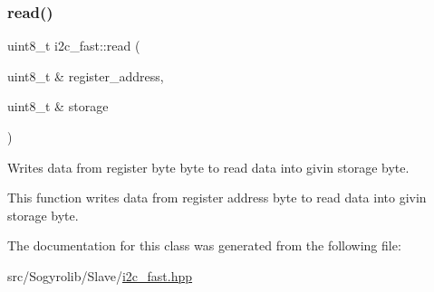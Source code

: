 \subsubsection{\texorpdfstring{read()}{read()}\hspace{0.1cm}{\footnotesize\ttfamily [2/2]}}
{\footnotesize\ttfamily uint8\+\_\+t i2c\+\_\+fast\+::read (\begin{DoxyParamCaption}\item[{uint8\+\_\+t \&}]{register\+\_\+address,  }\item[{uint8\+\_\+t \&}]{storage }\end{DoxyParamCaption})\hspace{0.3cm}{\ttfamily [inline]}}



Writes data from register byte byte to read data into givin storage byte. 

This function writes data from register address byte to read data into givin storage byte. 

The documentation for this class was generated from the following file\+:\begin{DoxyCompactItemize}
\item 
src/\+Sogyrolib/\+Slave/\hyperlink{i2c__fast_8hpp}{i2c\+\_\+fast.\+hpp}\end{DoxyCompactItemize}
